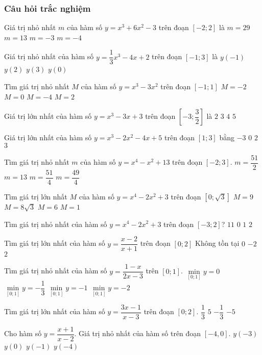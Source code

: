 \subsubsection{Câu hỏi trắc nghiệm}
\begin{ex}%
	Giá trị nhỏ nhất $m$ của hàm số $y=x^3+6x^2-3$ trên đoạn $[-2;2]$ là
	\choice
	{$m=29$}
	{$m=13$}
	{\True $m=-3$}
	{$m=-4$}
\end{ex}
\begin{ex}%
	Giá trị nhỏ nhất của hàm số $y=\dfrac{1}{3}x^3-4x+2$ trên đoạn $[-1;3]$ là
	\choice
	{$y(-1)$}
	{\True $y(2)$}
	{$y(3)$}
	{$y(0)$}
\end{ex}
\begin{ex}%
	Tìm giá trị nhỏ nhất $M$ của hàm số $y=x^3-3x^2$ trên đoạn $[-1;1]$ 
	\choice
	{$M=-2$}
	{$M=0$}
	{\True $M=-4$}
	{$M=2$}
\end{ex}
\begin{ex}%
	Giá trị lớn nhất của hàm số $y=x^3-3x+3$ trên đoạn $\left[-3;\dfrac{3}{2}\right]$ là 
	\choice
	{$2$}
	{$3$}
	{$4$}
	{\True $5$}
\end{ex}
\begin{ex}%
	Giá trị lớn nhất của hàm số $y=x^3-2x^2-4x+5$   trên đoạn $[1;3]$ bằng
	\choice
	{$-3$}
	{$0$}
	{\True $2$}
	{$3$}
\end{ex}
\begin{ex}%
	Tìm giá trị nhỏ nhất $m$ của hàm số $y=x^4-x^2+13$ trên đoạn $[-2;3]$. 
	\choice
	{$m=\dfrac{51}{2}$}
	{$m=13$}
	{\True $m=\dfrac{51}{4}$}
	{$m=\dfrac{49}{4}$}
\end{ex}
\begin{ex}%
	Tìm giá trị lớn nhất $M$ của hàm số $y=x^4-2x^2+3$ trên đoạn $[0;\sqrt{3}]$ 
	\choice
	{$M=9$}
	{$M=8\sqrt{3}$}
	{\True $M=6$}
	{$M=1$}
\end{ex}
\begin{ex}%
	Tìm giá trị nhỏ nhất của hàm số $y=x^4-2x^2+3$ trên đoạn $[-3;2]$?
	\choice
	{$11$}
	{$0$}
	{$1$}
	{\True $2$}
\end{ex}
\begin{ex}%
	Tìm giá trị lớn nhất của hàm số $y=\dfrac{x-2}{x+1}$ trên đoạn $[0;2]$ 
	\choice
	{Không tồn tại}
	{\True $0$}
	{$-2$}
	{$2$}
\end{ex}
\begin{ex}%
	Tìm giá trị nhỏ nhất của hàm số $y=\dfrac{1-x}{2x-3}$ trên $[0;1]$. 
	\choice
	{$\min\limits_{[0;1]} y=0$}
	{\True $\min\limits_{[0;1]} y=-\dfrac{1}{3}$}
	{$\min\limits_{[0;1]} y=-1$}
	{$\min\limits_{[0;1]} y=-2$}
\end{ex}
\begin{ex}%
	Tìm giá trị lớn nhất của hàm số $y=\dfrac{3x-1}{x-3}$ trên đoạn $[0;2]$. 
	\choice
	{\True $\dfrac{1}{3}$}
	{$5$}
	{$-\dfrac{1}{3}$}
	{$-5$}
\end{ex}
\begin{ex}%
	Cho hàm số $y=\dfrac{x+1}{x-2}$. Giá trị nhỏ nhất của hàm số trên đoạn $[-4,0]$. 
	\choice
	{$y(-3)$}
	{\True $y(0)$}
	{$y(-1)$}
	{$y(-4)$}
\end{ex}

